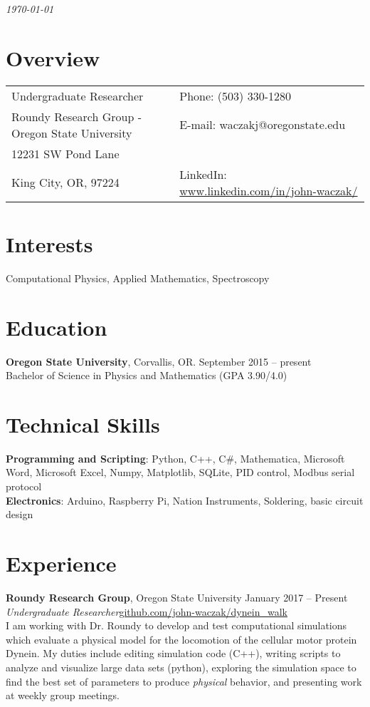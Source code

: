 \documentclass[margin,line]{res}
\begin{document}
 \hfill {\em \today}

\begin{resume}
\section{\sc Overview}

\vspace{.05in}
\begin{tabular}{@{}p{3.5in}p{3in}}
Undergraduate Researcher              & {Phone:}  (503) 330-1280 \\
Roundy Research Group - Oregon State University 
 & {E-mail:}  waczakj@oregonstate.edu\\
12231 SW Pond Lane\\
King City, OR, 97224  & {LinkedIn:} \scriptsize{ \url{www.linkedin.com/in/john-waczak/}}
\end{tabular}


\section{\sc Interests}

Computational Physics, Applied Mathematics, Spectroscopy

\section{\sc Education}
{\bf Oregon State University}, Corvallis, OR. \hfill September 2015 -- present\\
Bachelor of Science in Physics and Mathematics \hfill(GPA 3.90/4.0)

\section{\sc Technical Skills}
{\bf Programming and Scripting}: Python, C++, C\#, Mathematica, Microsoft Word, Microsoft Excel, Numpy, Matplotlib, SQLite, PID control, Modbus serial protocol \\
{\bf Electronics}: Arduino, Raspberry Pi, Nation Instruments, Soldering, basic circuit design 
\section{\sc Experience}
{\bf Roundy Research Group}, Oregon State University \hfill{January 2017 -- Present}\\
{\em Undergraduate Researcher}\hfill \scriptsize{\url{github.com/john-waczak/dynein_walk}}\\
I am working with Dr. Roundy to develop and test computational simulations which evaluate a physical model for the locomotion of the cellular motor protein Dynein. My duties include editing simulation code (C++), writing scripts to analyze and visualize large data sets (python), exploring the simulation space to find the best set of parameters to produce \textit{physical} behavior, and presenting work at weekly group meetings.


\end{resume}
\end{document}
